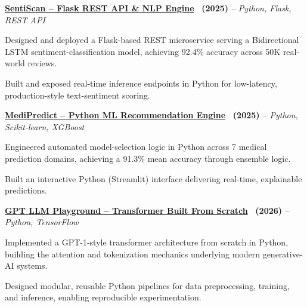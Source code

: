 \documentclass[10pt,letterpaper]{article}
\newcommand{\resumeBullet}[1]{%
    \noindent
    \hspace{4pt}
    {\fontsize{9}{10.3}\selectfont
    \textbullet\hspace{5pt}#1}
    \par
    \vspace{1pt}
}
\begin{document}
\noindent
\href{https://github.com/HelloVishnu04/Sentiment-Analysis.git}
{\textcolor{linkblue}{\textbf{SentiScan -- Flask REST API \& NLP Engine}}}
{\bfseries\ (2025)}
\hspace{4pt}
{\itshape -- Python, Flask, REST API}

\vspace{2pt}

\resumeBullet{
Designed and deployed a Flask-based REST microservice serving a
Bidirectional LSTM sentiment-classification model, achieving 92.4\%
accuracy across 50K real-world reviews.
}

\resumeBullet{
Built and exposed real-time inference endpoints in Python for low-latency,
production-style text-sentiment scoring.
}


\noindent
\href{https://github.com/HelloVishnu04/MediPredict-.git}
{\textcolor{linkblue}{\textbf{MediPredict -- Python ML Recommendation Engine}}}
{\bfseries\ (2025)}
\hspace{4pt}
{\itshape -- Python, Scikit-learn, XGBoost}

\vspace{2pt}

\resumeBullet{
Engineered automated model-selection logic in Python across 7 medical
prediction domains, achieving a 91.3\% mean accuracy through ensemble
logic.
}

\resumeBullet{
Built an interactive Python (Streamlit) interface delivering real-time,
explainable predictions.
}


\noindent
\href{https://github.com/HelloVishnu04/GPT_LLM_Playground.git}
{\textcolor{linkblue}{\textbf{GPT LLM Playground -- Transformer Built From Scratch}}}
{\bfseries\ (2026)}
\hspace{4pt}
{\itshape -- Python, TensorFlow}

\vspace{2pt}

\resumeBullet{
Implemented a GPT-1-style transformer architecture from scratch in Python,
building the attention and tokenization mechanics underlying modern
generative-AI systems.
}

\resumeBullet{
Designed modular, reusable Python pipelines for data preprocessing,
training, and inference, enabling reproducible experimentation.
}
\end{document}
